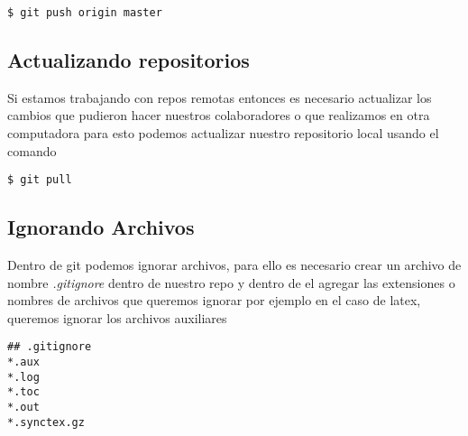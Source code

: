 \documentclass[12pt,a4paper]{article}
\begin{document}
\begin{verbatim}
$ git push origin master
\end{verbatim}

\subsection*{Actualizando repositorios}
Si estamos trabajando con repos remotas entonces es necesario actualizar los cambios que pudieron hacer nuestros colaboradores o que realizamos en otra computadora para esto podemos actualizar nuestro repositorio local usando el comando

\begin{verbatim}
$ git pull
\end{verbatim}

\subsection*{Ignorando Archivos}
Dentro de git podemos ignorar archivos, para ello es necesario crear un archivo de nombre \textit{.gitignore} dentro de nuestro repo y dentro de el agregar las extensiones o nombres de archivos que queremos ignorar por ejemplo en el caso de latex, queremos ignorar los archivos auxiliares
\begin{verbatim}
## .gitignore
*.aux
*.log
*.toc
*.out
*.synctex.gz
\end{verbatim}

\nocite{*}

\printbibliography
\end{document}
